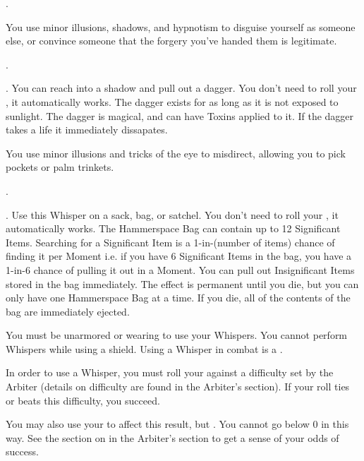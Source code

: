 {  
  .  

  You use minor illusions, shadows, and hypnotism to disguise yourself as someone else, or convince someone that the forgery you've handed them is legitimate.

  .  

  . You can reach into a shadow and pull out a dagger.  You don't need to roll your \KNAVE, it automatically works. The dagger exists for as long as it is not exposed to sunlight.  The dagger is magical, and can have Toxins applied to it.  If the dagger takes a life it immediately dissapates.



  You use minor illusions and tricks of the eye to misdirect, allowing you to pick pockets or palm trinkets. 

  . 

   . Use this Whisper on a sack, bag, or satchel. You don't need to roll your \KNAVE, it automatically works. The Hammerspace Bag can contain up to 12 Significant Items.  Searching for a Significant Item is a 1-in-(number of items) chance of finding it per Moment i.e. if you have 6 Significant Items in the bag, you have a 1-in-6 chance of pulling it out in a Moment.  You can pull out Insignificant Items stored in the bag immediately.  The effect is permanent until you die, but you can only have one Hammerspace Bag at a time.  If you die, all of the contents of the bag are immediately ejected. 


  You must be unarmored or wearing  to use your Whispers.  You cannot perform Whispers while using a shield.   Using a Whisper in combat is a .

  In order to use a Whisper, you must roll your \KNAVE against a difficulty set by the Arbiter (details on difficulty are found in the Arbiter's section).  If your roll ties or beats this difficulty, you succeed.  

  You may also use your \LUCK to affect this result, but .  You cannot go below 0 in this way.  See the section on  in the Arbiter's section to get a sense of your odds of success.

}
